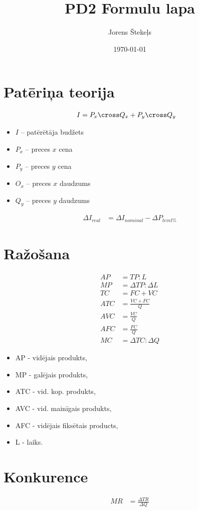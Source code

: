\documentclass[9pt]{article}
\title{ PD2 Formulu lapa}
\author{ Jorens Štekeļs}
\date{\today}
\begin{document}
\section{Patēriņa teorija}

\begin{align*}
    I &= P_x  \cross Q_x + P_y \cross Q_y
\end{align*}

\begin{itemize}
    \item $I$ – patērētāja budžets 
    \item $P_x$ – preces $x$ cena 
    \item $P_y$ – preces $y$ cena 
    \item $O_x$ – preces $x$ daudzums 
    \item $Q_y$ – preces $y$ daudzums 
\end{itemize}

\begin{align*}
    \Delta I_{real} &= \Delta I_{nominal} - \Delta P_{level\%}
\end{align*}

\section{Ražošana}

\begin{align*}
	AP &= TP:L \\
	MP &= \Delta TP:\Delta L \\
	TC &= FC + VC  \\
	ATC &= \frac{VC+FC}{Q} \\
	AVC &= \frac{VC}{Q} \\
	AFC &= \frac{FC}{Q} \\
	MC &= \Delta TC:\Delta Q  
\end{align*} 
\begin{itemize}
    \item AP - vidējais produkts,
    \item MP - galējais produkts,
    \item ATC - vid. kop. produkts,
    \item AVC - vid. mainīgais produkts,
    \item AFC - vidējais fiksētais products,
    \item L - laiks.
\end{itemize}

\section{Konkurence}

\begin{align*}
    MR &= \frac{\Delta TR}{\Delta Q}
\end{align*}
\end{document}
